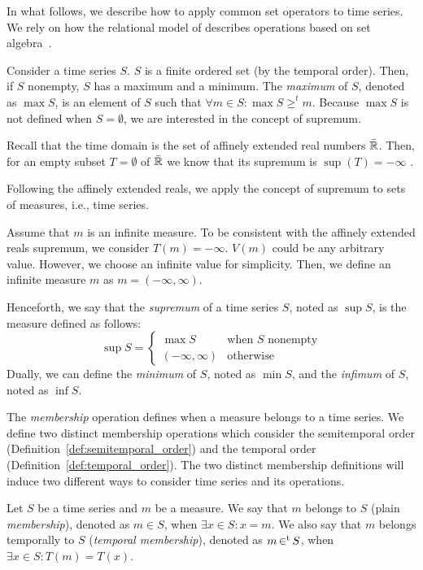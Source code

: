 In what follows, we describe how to apply common set operators to time
series. We rely on how the relational model of  describes
operations based on set algebra~\cite{date:introduction}.

Consider a time series $S$. $S$ is a finite ordered set (by the
temporal order). Then, if $S$ nonempty, $S$ has a maximum and a
minimum.  The \emph{maximum} of $S$, denoted as $\max S$, is an
element of $S$ such that $\forall m \in S:\max S\geq^t m $. Because
$\max S$ is not defined when $S=\emptyset$, we are interested in the
concept of supremum.

Recall that the time domain is the set of affinely extended real
numbers $\bar{\mathbb{R}}$. Then, for an empty subset $T=\emptyset$ of $\bar{\mathbb{R}}$ we
know that its supremum is $\sup(T)=-\infty$
\cite{cantrell:extendedreal}.

Following the affinely extended reals, we apply the concept of
supremum to sets of measures, i.e., time series.

Assume that $m$ is an infinite measure.  To be consistent with the
affinely extended reals supremum, we consider $T(m)=-\infty$. $V(m)$
could be any arbitrary value. However, we choose an infinite value for
simplicity.
%
Then, we define an infinite measure $m$ as $m=(-\infty,\infty)$.

Henceforth, we say that the \emph{supremum} of a time series $S$,
noted as $\sup S$, is the measure defined as follows:
\[
\sup S =\begin{cases}
  \max S              & \text{when $S$ nonempty}\\
  (-\infty,\infty)    & \text{otherwise}
\end{cases}
\]
Dually, we can define the \emph{minimum} of $S$, noted as $\min S$,
and the \emph{infimum} of $S$, noted as $\inf S$.

The \emph{membership} operation defines when a measure belongs to a
time series. We define two distinct membership operations which
consider the semitemporal order
(Definition~\ref{def:semitemporal_order}) and the temporal order
(Definition~\ref{def:temporal_order}). 
%
The two distinct membership definitions will induce two different ways
to consider time series and its operations.

Let $S$ be a time series and $m$ be a measure. We say that $m$ belongs
to $S$ (plain \emph{membership}), denoted as $m \in S$, when $\exists
x\in S: x=m$.  We also say that $m$ belongs temporally to $S$
(\emph{temporal membership}), denoted as $m \operatorname*{\in^t} S$, when $\exists
x\in S : T(m)=T(x)$.

